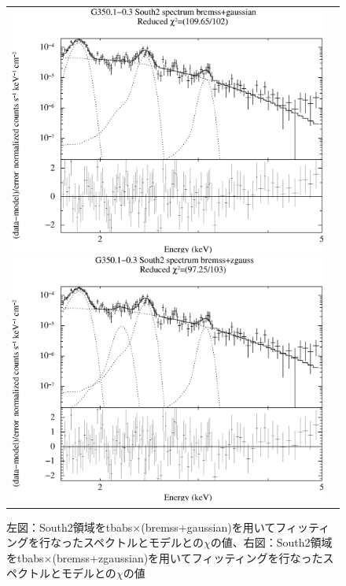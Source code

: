 \documentclass[a4j]{jarticle}%
\begin{document}
\begin{figure}[H]
\begin{center}
\begin{tabular}{cc}

\begin{minipage}{0.5\hsize}
\begin{center}
\includegraphics[scale=0.30]{./ps/South2_bremss+gaussian.eps}
\end{center}
\end{minipage}

\begin{minipage}{0.5\hsize}
\begin{center}
\includegraphics[scale=0.30]{./ps/South2_bremss+zgaussian.eps}
\end{center}
\end{minipage}
\end{tabular}
\caption{左図：South2領域をtbabs$\times$(bremss+gaussian)を用いてフィッティングを行なったスペクトルとモデルとの$\chi$の値、右図：South2領域をtbabs$\times$(bremss+zgaussian)を用いてフィッティングを行なったスペクトルとモデルとの$\chi$の値}
\label{fig:brem_South2}
\end{center}
\end{figure}
\end{document}
